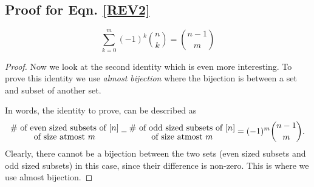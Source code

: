\subsection{Proof for Eqn. \eqref{REV2}} \label{subsec:identity-even-odd-2}
$$\sum_{k=0}^m (-1)^k{n\choose k} = {n-1\choose m}$$
\begin{proof}
Now we look at the second identity which is even more interesting. To prove this identity we use \emph{almost bijection} where the bijection is between a set and subset of another set.

In words, the identity to prove, can be described as
$$\Large\substack{\# \textrm{ of even sized subsets of  $[n]$}\\  \textrm{of size atmost $m$}} - \substack{\# \textrm{ of odd sized subsets of $[n]$} \\ \textrm{of size atmost $m$}} = (-1)^m{n-1\choose m}.$$ Clearly, there cannot be a bijection between the two sets (even sized subsets and odd sized subsets) in this case, since their difference is non-zero. This is where we use almost bijection.


\end{proof}
